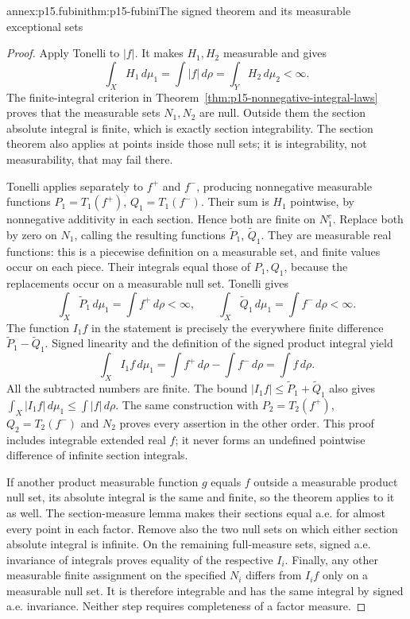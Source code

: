 \begin{annexitem}{annex:p15.fubini}{thm:p15-fubini}{The signed theorem and its measurable exceptional sets}
\begin{proof}
Apply Tonelli to \(|f|\). It makes \(H_1,H_2\) measurable and gives
\[
 \int_XH_1\,d\mu_1=\int|f|\,d\rho=\int_YH_2\,d\mu_2<\infty.
\]
The finite-integral criterion in
Theorem~\ref{thm:p15-nonnegative-integral-laws} proves that the
measurable sets \(N_1,N_2\) are null. Outside them the section
absolute integral is finite, which is exactly section integrability.
The section theorem also applies at points inside those null sets;
it is integrability, not measurability, that may fail there.

Tonelli applies separately to \(f^+\) and \(f^-\), producing
nonnegative measurable functions
\(P_1=T_1(f^+)\), \(Q_1=T_1(f^-)\).
Their sum is \(H_1\) pointwise, by nonnegative additivity in each
section. Hence both are finite on \(N_1^c\). Replace both by zero
on \(N_1\), calling the resulting functions \(\widetilde P_1\),
\(\widetilde Q_1\). They are measurable real functions: this is a
piecewise definition on a measurable set, and finite values occur on
each piece. Their integrals equal those of \(P_1,Q_1\), because
the replacements occur on a measurable null set. Tonelli gives
\[
 \int_X\widetilde P_1\,d\mu_1=\int f^+\,d\rho<\infty,
 \qquad
 \int_X\widetilde Q_1\,d\mu_1=\int f^-\,d\rho<\infty.
\]
The function \(I_1f\) in the statement is precisely the everywhere
finite difference \(\widetilde P_1-\widetilde Q_1\). Signed
linearity and the definition of the signed product integral yield
\[
 \int_X I_1f\,d\mu_1
   =\int f^+\,d\rho-\int f^-\,d\rho
   =\int f\,d\rho.
\]
All the subtracted numbers are finite. The bound
\(|I_1f|\leq\widetilde P_1+\widetilde Q_1\) also gives
\(\int_X|I_1f|\,d\mu_1\leq\int|f|\,d\rho\).
The same construction with \(P_2=T_2(f^+)\), \(Q_2=T_2(f^-)\)
and \(N_2\) proves every assertion in the other order. This proof
includes integrable extended real \(f\); it never forms an undefined
pointwise difference of infinite section integrals.

If another product measurable function \(g\) equals \(f\) outside
a measurable product null set, its absolute integral is the same and
finite, so the theorem applies to it as well. The section-measure
lemma makes their sections equal a.e. for almost every point in each
factor. Remove also the two null sets on which either section absolute
integral is infinite. On the remaining full-measure sets, signed a.e.
invariance of integrals proves equality of the respective \(I_i\).
Finally, any other measurable finite assignment on the specified
\(N_i\) differs from \(I_i f\) only on a measurable null set.
It is therefore integrable and has the same integral by signed a.e.
invariance. Neither step requires completeness of a factor measure.
\end{proof}
\end{annexitem}

